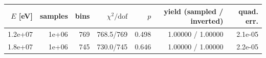 \begin{tabular}{rrrrrrr}
\toprule
$E$ [eV] & samples & bins & $\chi^2/\mathrm{dof}$ & $p$ & yield (sampled / inverted) & quad. err. \\
\midrule
1.2e+07 & 1e+06 & 769 & 768.5/769 & 0.498 & 1.00000 / 1.00000 & 2.1e-05 \\
1.8e+07 & 1e+06 & 745 & 730.0/745 & 0.646 & 1.00000 / 1.00000 & 2.2e-05 \\
\bottomrule
\end{tabular}
